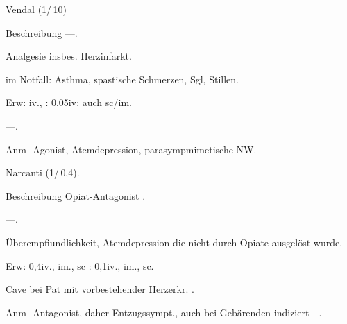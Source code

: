 
{
\begin{MedikamentCharakteristika}
  \item[{\TxItemSpezialitaeten}] Vendal{\texttrademark} 
  (1\Ml*/\,10\Mg*)
  \item[Beschreibung] ---.
  \item[{\TxItemIndikation}] Analgesie insbes. Herzinfarkt.
  \item[{\TxItemKontraindikation}]  im Notfall: Asthma, spastische 
  Schmerzen, Sgl, Stillen.
  \item[{\TxItemDosierung}] Erw: \Mg* iv., 
  : 0,05\MgKg* iv; auch
  sc/im.
  \item[{\TxItemCave}] ---.
  \item[Anm] {\textmu}-Agonist, Atemdepression, parasympmimetische NW.
\end{MedikamentCharakteristika}}
{}










{

\begin{MedikamentCharakteristika}
  \item[{\TxItemSpezialitaeten}]  Narcanti{\texttrademark} 
  (1\Ml*/\,0,4\Mg*).
  \item[Beschreibung] Opiat-Antagonist .
  \item[{\TxItemIndikation}] ---.
  \item[{\TxItemKontraindikation}] Überempfiundlichkeit, 
  Atemdepression die nicht durch Opiate
ausgelöst wurde.
  \item[{\TxItemDosierung}] Erw: 0,4\Mg* iv., im., 
  sc\newline
{}: 0,1\MgKg* iv., im., sc.
  \item[{\TxItemCave}]  Cave bei Pat mit vorbestehender Herzerkr. .
  \item[Anm]  {\textmu}-Antagonist, daher Entzugssympt., auch bei 
  Gebärenden
indiziert---.
\end{MedikamentCharakteristika}}
{}






